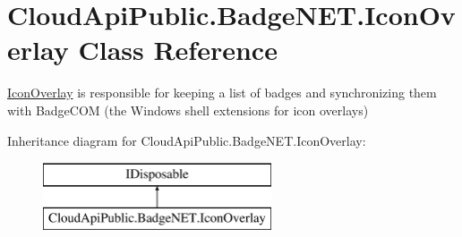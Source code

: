 \hypertarget{class_cloud_api_public_1_1_badge_n_e_t_1_1_icon_overlay}{\section{Cloud\-Api\-Public.\-Badge\-N\-E\-T.\-Icon\-Overlay Class Reference}
\label{class_cloud_api_public_1_1_badge_n_e_t_1_1_icon_overlay}
}


\hyperlink{class_cloud_api_public_1_1_badge_n_e_t_1_1_icon_overlay}{Icon\-Overlay} is responsible for keeping a list of badges and synchronizing them with Badge\-C\-O\-M (the Windows shell extensions for icon overlays)  


Inheritance diagram for Cloud\-Api\-Public.\-Badge\-N\-E\-T.\-Icon\-Overlay\-:\begin{figure}[H]
\begin{center}
\leavevmode
\includegraphics[height=2.000000cm]{class_cloud_api_public_1_1_badge_n_e_t_1_1_icon_overlay}
\end{center}
\end{figure}
